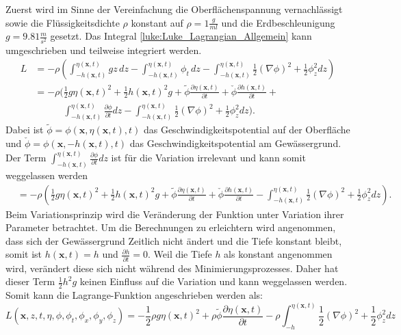 Zuerst wird im Sinne der Vereinfachung die Oberflächenspannung vernachlässigt sowie die Flüssigkeitsdichte $\rho$ konstant auf $\rho = 1\frac{g}{ml}$ und die Erdbeschleunigung $g = 9.81\frac{m}{s^2}$ gesetzt.
Das Integral \eqref{luke:Luke_Lagrangian_Allgemein} kann umgeschrieben und teilweise integriert werden.
\begin{align*}
	L
	&=
	-\rho\left(\int_{-h(\bm{x},t)}^{\eta(\bm{x},t)} g z\, dz - \int_{-h(\bm{x},t)}^{\eta(\bm{x},t)} \phi_t\, dz -\int_{-h(\bm{x},t)}^{\eta(\bm{x},t)} \frac{1}{2}\left(\nabla\phi\right)^2 + \frac{1}{2}\phi_z^2 dz\right)
	\\
	&=
	-\rho\Bigg(\frac{1}{2}g\eta(\bm{x},t)^2 + \frac{1}{2}h(\bm{x},t)^2g +\tilde{\phi} \frac{\partial\eta(\bm{x},t)}{\partial t} + \check{\phi} \frac{\partial h(\bm{x},t)}{\partial t} + \\ &\qquad\quad\int_{-h(\bm{x},t)}^{\eta(\bm{x},t)} \frac{\partial \phi}{\partial t}dz
	-\int_{-h(\bm{x},t)}^{\eta(\bm{x},t)} \frac{1}{2}\left(\nabla\phi\right)^2 + \frac{1}{2}\phi_z^2 dz\Bigg).
\end{align*}
Dabei ist $\tilde{\phi} = \phi(\bm{x},\eta(\bm{x},t),t)$ das Geschwindigkeitspotential auf der Oberfläche und $\check{\phi} = \phi(\bm{x},-h(\bm{x},t),t)$ das Geschwindigkeitspotential am Gewässergrund.
Der Term $\int_{-h(\bm{x},t)}^{\eta(\bm{x},t)} \frac{\partial \phi}{\partial t}dz$ ist für die Variation irrelevant und kann somit weggelassen werden
\begin{align*}
	&=
	-\rho\left(\frac{1}{2}g\eta(\bm{x},t)^2 + \frac{1}{2}h(\bm{x},t)^2g +\tilde{\phi} \frac{\partial\eta(\bm{x},t)}{\partial t} + \check{\phi} \frac{\partial h(\bm{x},t)}{\partial t}-\int_{-h(\bm{x},t)}^{\eta(\bm{x},t)} \frac{1}{2}\left(\nabla\phi\right)^2 + \frac{1}{2}\phi_z^2 dz\right).
\end{align*}
Beim Variationsprinzip wird die Veränderung der Funktion unter Variation ihrer Parameter betrachtet.
Um die Berechnungen zu erleichtern wird angenommen, dass sich der Gewässergrund Zeitlich nicht ändert und die Tiefe konstant bleibt, somit ist $h(\bm{x},t) = h$ und $\frac{\partial h}{\partial t} = 0$.
Weil die Tiefe $h$ als konstant angenommen wird, verändert diese sich nicht während des Minimierungsprozesses.
Daher hat dieser Term $\frac{1}{2}h^2g$ keinen Einfluss auf die Variation und kann weggelassen werden.
Somit kann die Lagrange-Funktion angeschrieben werden als:
\[
L(\bm{x},z,t,\eta,\phi,\phi_t,\phi_x, \phi_y, \phi_z)
= 
-\frac{1}{2}\rho g\eta(\bm{x},t)^2 +\rho \tilde{\phi} \frac{\partial\eta(\bm{x},t)}{\partial t} -\rho \int_{-h}^{\eta(\bm{x},t)} \frac{1}{2}\left(\nabla\phi\right)^2 + \frac{1}{2}\phi_z^2 dz
\]
